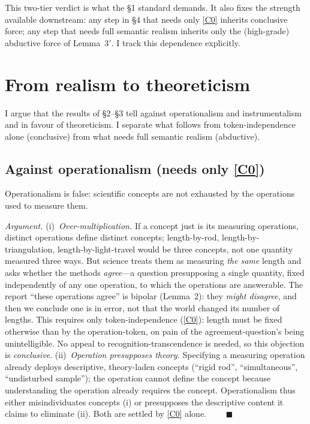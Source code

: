 \documentclass[12pt]{article}
\begin{document}
This two-tier verdict is what the \S1 standard demands. It also fixes the
strength available downstream: any step in \S4 that needs only \ref{C0}
inherits conclusive force; any step that needs full semantic realism
inherits only the (high-grade) abductive force of Lemma~3$'$. I track
this dependence explicitly.

\section{From realism to theoreticism}

I argue that the results of \S2--\S3 tell against operationalism and
instrumentalism and in favour of theoreticism. I separate what follows
from token-independence alone (conclusive) from what needs full semantic
realism (abductive).

\subsection{Against operationalism (needs only \ref{C0})}

\begin{description}[leftmargin=1.6em,style=nextline]
\item[Claim 4.] Operationalism is false: scientific concepts are not
exhausted by the operations used to measure them.
\end{description}

\noindent\emph{Argument.} (i)~\emph{Over-multiplication.} If a concept
just is its measuring operations, distinct operations define distinct
concepts; length-by-rod, length-by-triangulation, length-by-light-travel
would be three concepts, not one quantity measured three ways. But science
treats them as measuring \emph{the same} length and asks whether the
methods \emph{agree}---a question presupposing a single quantity, fixed
independently of any one operation, to which the operations are
answerable. The report ``these operations agree'' is bipolar (Lemma~2):
they \emph{might disagree}, and then we conclude one is in error, not that
the world changed its number of lengths. This requires only
token-independence (\ref{C0}): length must be fixed otherwise than by the
operation-token, on pain of the agreement-question's being unintelligible.
No appeal to recognition-transcendence is needed, so this objection is
\emph{conclusive}. (ii)~\emph{Operation presupposes theory.} Specifying a
measuring operation already deploys descriptive, theory-laden concepts
(``rigid rod'', ``simultaneous'', ``undisturbed sample''); the operation
cannot define the concept because understanding the operation already
requires the concept. Operationalism thus either misindividuates concepts
(i) or presupposes the descriptive content it claims to eliminate (ii).
Both are settled by \ref{C0} alone.
$\qquad\blacksquare$
\end{document}
